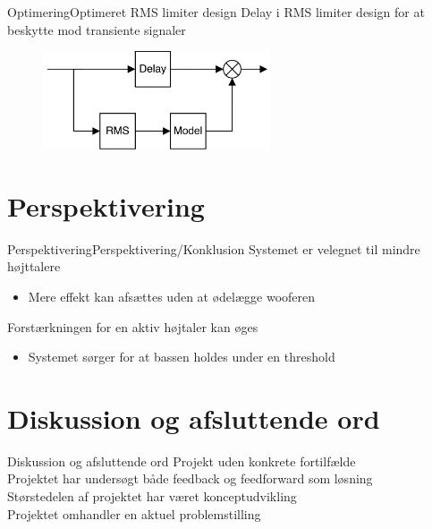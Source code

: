 \begin{frame}{Optimering}{Optimeret RMS limiter design}
Delay i RMS limiter design for at beskytte mod transiente signaler
\begin{figure}[H]
\centering
\includegraphics[width=0.6\textwidth]{RMSoptimering}
\end{figure}
\end{frame}

\section{Perspektivering}
\begin{frame}{Perspektivering}{Perspektivering/Konklusion}
Systemet er velegnet til mindre højttalere \\
\begin{itemize}
\item Mere effekt kan afsættes uden at ødelægge wooferen
\end{itemize}	
\vspace{5mm}
Forstærkningen for en aktiv højtaler kan øges \\
\begin{itemize}
\item Systemet sørger for at bassen holdes under en threshold
\end{itemize}	
\end{frame}

\section{Diskussion og afsluttende ord}
\begin{frame}{Diskussion og afsluttende ord}
Projekt uden konkrete fortilfælde \\
\vspace{5mm}
Projektet har undersøgt både feedback og feedforward som løsning \\
\vspace{5mm}
Størstedelen af projektet har været konceptudvikling \\
\vspace{5mm}
Projektet omhandler en aktuel problemstilling
\end{frame}


